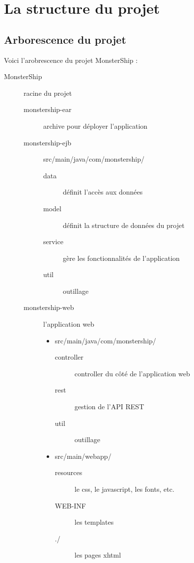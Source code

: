 \documentclass[a4paper,11pt]{report}
\begin{document}
  \section{La structure du projet}

    \subsection{Arborescence du projet}
      Voici l'arobrescence du projet MonsterShip :
      \begin{description}
        \item[MonsterShip] racine du projet
        \begin{description}
          \item[monstership-ear] archive pour déployer l'application
          \item[monstership-ejb] src/main/java/com/monstership/
          \begin{description}
            \item[data] définit l'accès aux données
            \item[model] définit la structure de données du projet
            \item[service] gère les fonctionnalités de l'application 
            \item[util] outillage
          \end{description}
          \item[monstership-web] l'application web
          \begin{itemize}
            \item src/main/java/com/monstership/
            \begin{description}
              \item[controller] controller du côté de l'application web
              \item[rest] gestion de l'API REST
              \item[util] outillage
            \end{description}
            \item src/main/webapp/
            \begin{description}
              \item[resources] le css, le javascript, les fonts, etc.
              \item[WEB-INF] les templates
              \item[./] les pages xhtml
            \end{description}
          \end{itemize}
        \end{description}
      \end{description}
\end{document}
